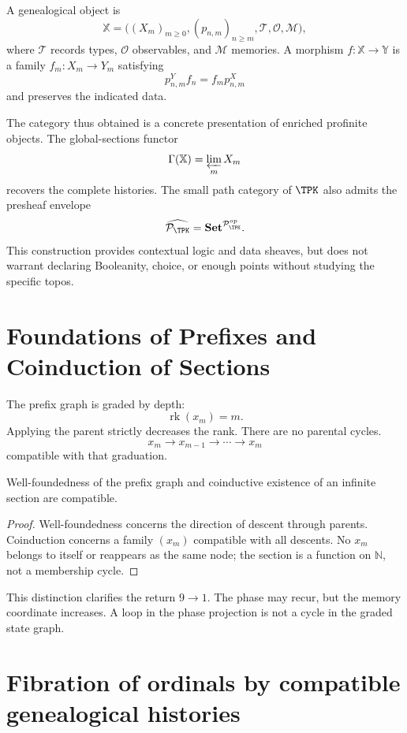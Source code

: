 \begin{definition}
A genealogical object is
\[
  \mathbb X=
  \bigl((X_m)_{m\ge0},(p_{n,m})_{n\ge m},
  \mathcal T,\mathcal O,\mathcal M\bigr),
\]
where \(\mathcal T\) records types, \(\mathcal O\) observables, and
\(\mathcal M\) memories. A morphism
\(f:\mathbb X\to\mathbb Y\) is a family \(f_m:X_m\to Y_m\) satisfying
\[
  p^Y_{n,m}f_n=f_mp^X_{n,m}
\]
and preserves the indicated data.
\end{definition}

The category thus obtained is a concrete presentation of enriched
profinite objects. The global-sections functor
\[
  \Gamma(\mathbb X)=\varprojlim_mX_m
\]
recovers the complete histories. The small path category of
\(\TPK\) also admits the presheaf envelope
\[
  \widehat{\mathcal P_{\TPK}}
  =
  \mathbf{Set}^{\mathcal P_{\TPK}^{op}}.
\]
This construction provides contextual logic and data sheaves, but does not
warrant declaring Booleanity, choice, or enough points without studying the
specific topos.

\section{Foundations of Prefixes and Coinduction of Sections}

The prefix graph is graded by depth:
\[
  \operatorname{rk}(x_m)=m.
\]
Applying the parent strictly decreases the rank. There are no parental cycles.
\[
  x_m\to x_{m-1}\to\cdots\to x_m
\]
compatible with that graduation.

\begin{proposition}
Well-foundedness of the prefix graph and coinductive existence of an
infinite section are compatible.
\end{proposition}

\begin{proof}
Well-foundedness concerns the direction of descent through parents.
Coinduction concerns a family \((x_m)\) compatible with all descents.
No \(x_m\) belongs to itself or reappears as the same node; the
section is a function on \(\mathbb N\), not a membership cycle.
\end{proof}

This distinction clarifies the return \(9\to1\). The phase may recur, but
the memory coordinate increases. A loop in the phase projection is not a
cycle in the graded state graph.

\section{Fibration of ordinals by compatible genealogical histories}

